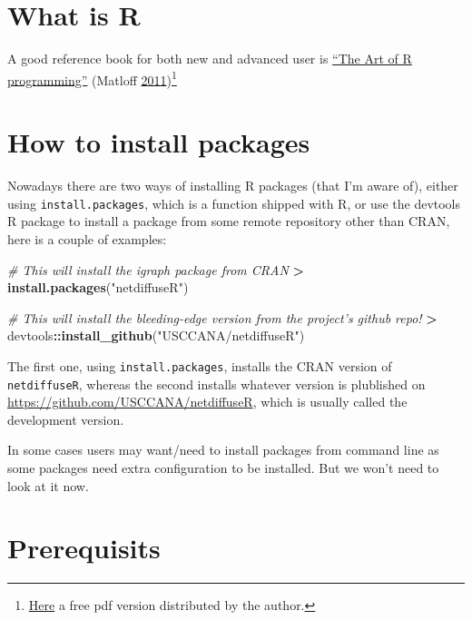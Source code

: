 \documentclass[]{book}
\newenvironment{Shaded}{\begin{snugshade}}{\end{snugshade}}
\newcommand{\CommentTok}[1]{\textcolor[rgb]{0.56,0.35,0.01}{\textit{#1}}}
\newcommand{\KeywordTok}[1]{\textcolor[rgb]{0.13,0.29,0.53}{\textbf{#1}}}
\newcommand{\NormalTok}[1]{#1}
\newcommand{\OperatorTok}[1]{\textcolor[rgb]{0.81,0.36,0.00}{\textbf{#1}}}
\newcommand{\StringTok}[1]{\textcolor[rgb]{0.31,0.60,0.02}{#1}}
\begin{document}
\hypertarget{what-is-r}{%
\section{What is R}\label{what-is-r}}

A good reference book for both new and advanced user is \href{https://nostarch.com/artofr.htm}{``The Art of R programming''} (Matloff \protect\hyperlink{ref-Matloff2011}{2011})\footnote{\href{http://heather.cs.ucdavis.edu/~matloff/145/PLN/RMaterials/NSPpart.pdf}{Here} a free pdf version distributed by the author.}

\hypertarget{how-to-install-packages}{%
\section{How to install packages}\label{how-to-install-packages}}

Nowadays there are two ways of installing R packages (that I'm aware of), either using \texttt{install.packages}, which is a function shipped with R, or use the devtools R package to install a package from some remote repository other than CRAN, here is a couple of examples:

\begin{Shaded}
\begin{Highlighting}[]
\CommentTok{# This will install the igraph package from CRAN}
\OperatorTok{>}\StringTok{ }\KeywordTok{install.packages}\NormalTok{(}\StringTok{"netdiffuseR"}\NormalTok{)}

\CommentTok{# This will install the bleeding-edge version from the project's github repo!}
\OperatorTok{>}\StringTok{ }\NormalTok{devtools}\OperatorTok{::}\KeywordTok{install_github}\NormalTok{(}\StringTok{"USCCANA/netdiffuseR"}\NormalTok{)}
\end{Highlighting}
\end{Shaded}

The first one, using \texttt{install.packages}, installs the CRAN version of \texttt{netdiffuseR}, whereas the second installs whatever version is plublished on \url{https://github.com/USCCANA/netdiffuseR}, which is usually called the development version.

In some cases users may want/need to install packages from command line as some packages need extra configuration to be installed. But we won't need to look at it now.

\hypertarget{prerequisits}{%
\section{Prerequisits}\label{prerequisits}}
\end{document}
